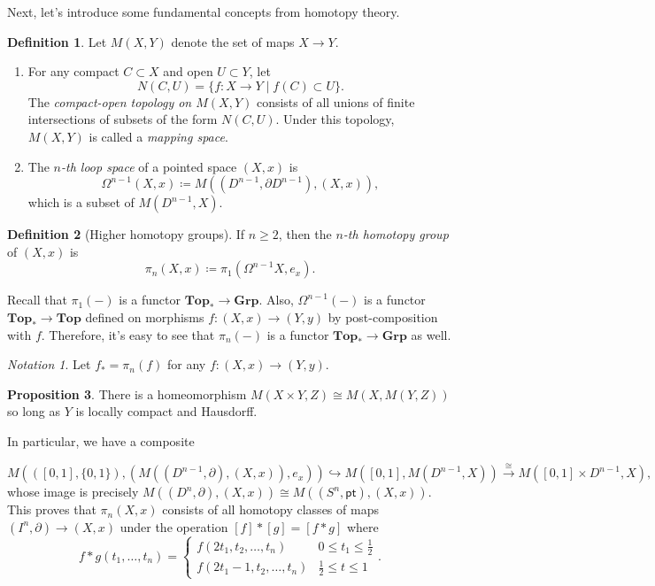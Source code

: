 \documentclass[10pt,letterpaper,cm]{nupset}
\theoremstyle{definition}
\newtheorem{defn}{Definition}[subsection]
\theoremstyle{theorem}
\newtheorem{prop}[defn]{Proposition}
\theoremstyle{remark}
\newtheorem*{notation}{Notation}
\newcommand{\1}{\mathbb{1}}
\newcommand{\0}{\vec 0}
\newcommand{\pt}{\mathsf{pt}}
\newcommand{\be}{\begin{enumerate}}
\newcommand{\ee}{\end{enumerate}}
\begin{document}
\bigskip

Next, let's introduce some fundamental concepts from homotopy theory. 

\begin{defn} Let $M(X, Y)$ denote the set of maps $X \to Y$. 
\be
\item For any compact $C \subset X$ and open $U \subset Y$, let $$N(C, U) = \{f : X \to Y \mid f(C) \subset U \}  .$$ The \textit{compact-open topology on $M(X, Y)$} consists of all unions of finite intersections of subsets of the form $N(C, U)$. Under this topology, $M(X,Y)$ is called a \textit{mapping space}. 
\item The \textit{$n$-th loop space} of a pointed space $(X, x)$ is $$\Omega^{n-1}(X, x) \coloneqq M((D^{n-1}, \partial{D^{n-1}}), (X, x)),$$  which is a subset of $M(D^{n-1}, X)$.
\ee 
\end{defn}


\begin{defn}[Higher homotopy groups]
If $n \geq 2$, then the \textit{$n$-th homotopy group} of $(X, x)$ is $$\pi_n(X,x) \coloneqq \pi_1(\Omega^{n-1}{X}, e_x).$$
\end{defn}

Recall that $\pi_1({-})$ is a functor $\mathbf{Top}_{\ast} \to \mathbf{Grp}$. Also, $\Omega^{n-1}({-})$ is a functor $\mathbf{Top}_{\ast}  \to \mathbf{Top} $ defined on morphisms $f: (X, x) \to (Y, y)$ by post-composition with $f$.
 Therefore, it's easy to see that $\pi_n({-})$ is a functor $\mathbf{Top}_{\ast} \to \mathbf{Grp}$ as well.

\begin{notation} 
Let $f_{\ast} =  \pi_n(f)$ for any $f: (X, x) \to (Y, y)$.
\end{notation}

\begin{prop}
There is a homeomorphism $M(X \times Y, Z) \cong M(X, M(Y, Z))$ so long as $Y$ is locally compact and Hausdorff. 
\end{prop}

In particular, we have a composite 

\[
M(([0,1], \{0,1\}), (M((D^{n-1}, \partial), (X,x)), e_x)) \hookrightarrow M([0,1], M(D^{n-1}, X)) \overset{\cong}{\longrightarrow} M([0,1] \times D^{n-1}, X),
\] whose image is precisely $M((D^n, \partial), (X,x)) \cong M((S^n, \pt), (X,x))$. This proves that $\pi_n(X,x)$ consists of all homotopy classes of maps $(I^n, \partial) \to (X,x)$ under the operation $[f] \ast [g] = [f \ast g]$ where $$ f \ast g(t_1, \ldots, t_n) = \begin{cases}
      f(2t_1, t_2, \ldots, t_n) & 0\leq t_1 \leq \frac{1}{2}
      \\ f(2t_1-1, t_2, \ldots, t_n) & \frac{1}{2} \leq t\leq 1
\end{cases}    .$$
\end{document}

